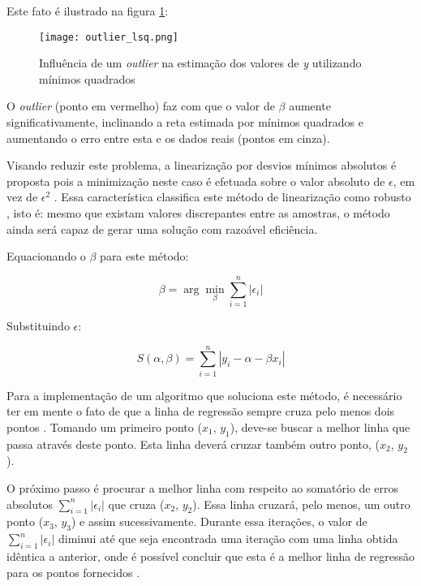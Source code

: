 Este fato é ilustrado na figura \ref{fig:infl_outlier}:

\begin{figure}[htp]
    \centering
    \texttt{[image: outlier\_lsq.png]}
    \caption{Influência de um \textit{outlier} na estimação dos valores de \textit{y} utilizando mínimos quadrados}
    \label{fig:infl_outlier}
\end{figure}

O \textit{outlier} (ponto em vermelho) faz com que o valor de $\beta$ aumente significativamente, inclinando a reta estimada por mínimos quadrados e aumentando o erro entre esta e os dados reais (pontos em cinza).

Visando reduzir este problema, a linearização por desvios mínimos absolutos é proposta pois a minimização neste caso é efetuada sobre o valor absoluto de $\epsilon$, em vez de $\epsilon^2$ \cite{lad}. Essa característica classifica este método de linearização como robusto \cite{robust}, isto é: mesmo que existam valores discrepantes entre as amostras, o método ainda será capaz de gerar uma solução com razoável eficiência.

Equacionando o $\beta$ para este método:

\begin{equation}\label{eq:17}
 \beta =\arg\min_{\beta}\sum_{i=1}^{n}|\epsilon_{i}|
\end{equation}

Substituindo $\epsilon$:

\begin{equation}\label{eq:18}
S(\alpha, \beta) = \sum_{i=1}^{n} |y_i - \alpha - \beta x_i|
\end{equation}

Para a implementação de um algoritmo que soluciona este método, é necessário ter em mente o fato de que a linha de regressão sempre cruza pelo menos dois pontos \cite{lad}. Tomando um primeiro ponto ($x_1$, $y_1$), deve-se buscar a melhor linha que passa através deste ponto. Esta linha deverá cruzar também outro ponto, ($x_2$, $y_2$). 

O próximo passo é procurar a melhor linha com respeito ao somatório de erros absolutos $\sum_{i=1}^{n}|\epsilon_{i}|$ que cruza ($x_2$, $y_2$). Essa linha cruzará, pelo menos, um outro ponto ($x_3$, $y_3$) e assim sucessivamente. Durante essa iterações, o valor de $\sum_{i=1}^{n}|\epsilon_{i}|$ diminui até que seja encontrada uma iteração com uma linha obtida idêntica a anterior, onde é possível concluir que esta é a melhor linha de regressão para os pontos fornecidos \cite{conciseenclyclopediaofstatistics}.

